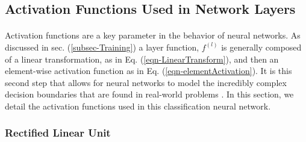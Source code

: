 \documentclass[12pt,letterpaper]{article}
\begin{document}

\subsection{Activation Functions Used in Network Layers}
\label{sec-ActivationFunctions}

\paragraph*{}Activation functions are a key parameter in the behavior of neural networks. As discussed in sec. (\ref{subsec-Training}) a layer function, $f^{(l)}$ is generally composed of a linear transformation, as in Eq. (\ref{eqn-LinearTransform}), and then an element-wise activation function as in Eq. (\ref{eqn-elementActivation}). It is this second step that allows for neural networks to model the incredibly complex decision boundaries that are found in real-world problems \cite{Geron,Loy}. In this section, we detail the activation functions used in this classification neural network. 

\subsubsection{Rectified Linear Unit}
\end{document}
